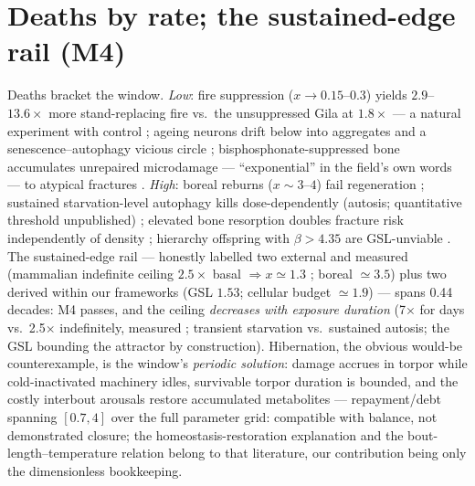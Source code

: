 \documentclass[11pt]{article}
\begin{document}
\section{Deaths by rate; the sustained-edge rail (M4)}
Deaths bracket the window. \emph{Low}: fire suppression ($x \to 0.15$--$0.3$) yields
$2.9$--$13.6\times$ more stand-replacing fire vs.\ the unsuppressed Gila at $1.8\times$ ---
a natural experiment with control \cite{Parks2023}; ageing neurons drift below into aggregates
and a senescence--autophagy vicious circle \cite{Neuron2024}; bisphosphonate-suppressed bone
accumulates unrepaired microdamage --- ``exponential'' in the field's own words --- to atypical
fractures \cite{AFF}. \emph{High}: boreal reburns ($x \sim 3$--$4$) fail regeneration
\cite{Boreal2025}; sustained starvation-level autophagy kills dose-dependently (autosis;
quantitative threshold unpublished) \cite{Liu2013}; elevated bone resorption doubles fracture
risk independently of density \cite{MayoBTM}; hierarchy offspring with $\beta > 4.35$ are
GSL-unviable \cite{PaperB}. The sustained-edge rail --- honestly labelled two external and
measured (mammalian indefinite ceiling $2.5\times$ basal $\Rightarrow x \simeq 1.3$
\cite{Thurber2019,HD1997,DrentDaan}; boreal $\simeq 3.5$) plus two derived within our frameworks
(GSL $1.53$; cellular budget $\simeq 1.9$) --- spans 0.44 decades: M4 passes, and the ceiling
\emph{decreases with exposure duration} (7$\times$ for days vs.\ 2.5$\times$ indefinitely,
measured \cite{Thurber2019}; transient starvation vs.\ sustained autosis; the GSL bounding the
attractor by construction). Hibernation, the obvious would-be counterexample, is the window's
\emph{periodic solution}: damage accrues in torpor while cold-inactivated machinery idles,
survivable torpor duration is bounded, and the costly interbout arousals restore accumulated
metabolites \cite{Carey2003} --- repayment/debt spanning $[0.7, 4]$ over the full parameter grid:
compatible with balance, not demonstrated closure; the homeostasis-restoration explanation and
the bout-length--temperature relation belong to that literature, our contribution being only the
dimensionless bookkeeping.
\end{document}
